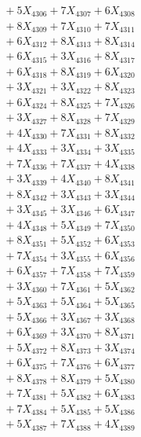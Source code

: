 \documentclass[a4paper,10pt]{article}
\begin{document}
{\begin{align}
&\;  + 5 X_{4306} + 7 X_{4307} + 6 X_{4308} \\[0.3ex]
&\;  + 8 X_{4309} + 7 X_{4310} + 7 X_{4311} \\[0.3ex]
&\;  + 6 X_{4312} + 8 X_{4313} + 8 X_{4314} \\[0.3ex]
&\;  + 6 X_{4315} + 3 X_{4316} + 8 X_{4317} \\[0.3ex]
&\;  + 6 X_{4318} + 8 X_{4319} + 6 X_{4320} \\[0.3ex]
&\;  + 3 X_{4321} + 3 X_{4322} + 8 X_{4323} \\[0.3ex]
&\;  + 6 X_{4324} + 8 X_{4325} + 7 X_{4326} \\[0.3ex]
&\;  + 3 X_{4327} + 8 X_{4328} + 7 X_{4329} \\[0.5ex]\allowbreak
&\;  + 4 X_{4330} + 7 X_{4331} + 8 X_{4332} \\[0.3ex]
&\;  + 4 X_{4333} + 3 X_{4334} + 3 X_{4335} \\[0.3ex]
&\;  + 7 X_{4336} + 7 X_{4337} + 4 X_{4338} \\[0.3ex]
&\;  + 3 X_{4339} + 4 X_{4340} + 8 X_{4341} \\[0.3ex]
&\;  + 8 X_{4342} + 3 X_{4343} + 3 X_{4344} \\[0.3ex]
&\;  + 3 X_{4345} + 3 X_{4346} + 6 X_{4347} \\[0.3ex]
&\;  + 4 X_{4348} + 5 X_{4349} + 7 X_{4350} \\[0.3ex]
&\;  + 8 X_{4351} + 5 X_{4352} + 6 X_{4353} \\[0.3ex]
&\;  + 7 X_{4354} + 3 X_{4355} + 6 X_{4356} \\[0.3ex]
&\;  + 6 X_{4357} + 7 X_{4358} + 7 X_{4359} \\[0.5ex]\allowbreak
&\;  + 3 X_{4360} + 7 X_{4361} + 5 X_{4362} \\[0.3ex]
&\;  + 5 X_{4363} + 5 X_{4364} + 5 X_{4365} \\[0.3ex]
&\;  + 5 X_{4366} + 3 X_{4367} + 3 X_{4368} \\[0.3ex]
&\;  + 6 X_{4369} + 3 X_{4370} + 8 X_{4371} \\[0.3ex]
&\;  + 5 X_{4372} + 8 X_{4373} + 3 X_{4374} \\[0.3ex]
&\;  + 6 X_{4375} + 7 X_{4376} + 6 X_{4377} \\[0.3ex]
&\;  + 8 X_{4378} + 8 X_{4379} + 5 X_{4380} \\[0.3ex]
&\;  + 7 X_{4381} + 5 X_{4382} + 6 X_{4383} \\[0.3ex]
&\;  + 7 X_{4384} + 5 X_{4385} + 5 X_{4386} \\[0.3ex]
&\;  + 5 X_{4387} + 7 X_{4388} + 4 X_{4389} \\[0.5ex]\allowbreak

\end{align}}
\end{document}
